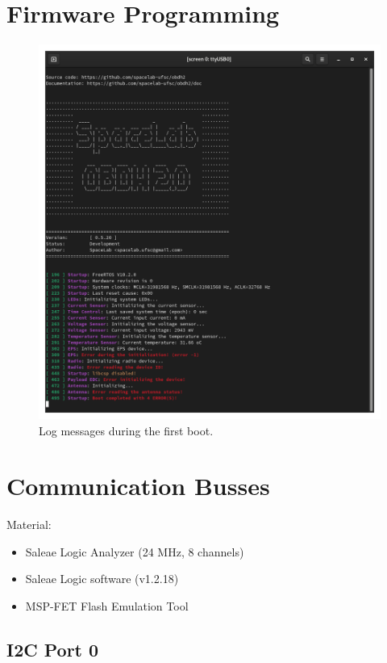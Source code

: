 \section{Firmware Programming}

\begin{figure}[!ht]
    \begin{center}
        \includegraphics[width=0.8\columnwidth]{figures/v05/log-first-boot.png}
        \caption{Log messages during the first boot.}
        \label{fig:log-first-boot}
    \end{center}
\end{figure}

\section{Communication Busses}

Material:

\begin{itemize}
    \item Saleae Logic Analyzer (24 MHz, 8 channels)
    \item Saleae Logic software (v1.2.18)
    \item MSP-FET Flash Emulation Tool
\end{itemize}

\subsection{I2C Port 0}


